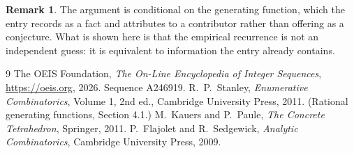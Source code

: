 \documentclass[11pt,a4paper]{article}
\theoremstyle{plain}
\theoremstyle{definition}
\newtheorem{remark}[theorem]{Remark}
\begin{document}
\begin{remark}
The argument is conditional on the generating function, which the entry records as a fact and
attributes to a contributor rather than offering as a conjecture. What is shown here is that
the empirical recurrence is not an independent guess: it is equivalent to information the
entry already contains.
\end{remark}

\begin{thebibliography}{9}
 The OEIS Foundation, \emph{The On-Line Encyclopedia of Integer
Sequences}, \url{https://oeis.org}, 2026. Sequence A246919.
 R.~P.~Stanley, \emph{Enumerative Combinatorics}, Volume 1, 2nd ed.,
Cambridge University Press, 2011. (Rational generating functions, Section 4.1.)
 M.~Kauers and P.~Paule, \emph{The Concrete Tetrahedron}, Springer, 2011.
 P.~Flajolet and R.~Sedgewick, \emph{Analytic Combinatorics}, Cambridge
University Press, 2009.
\end{thebibliography}
\end{document}
